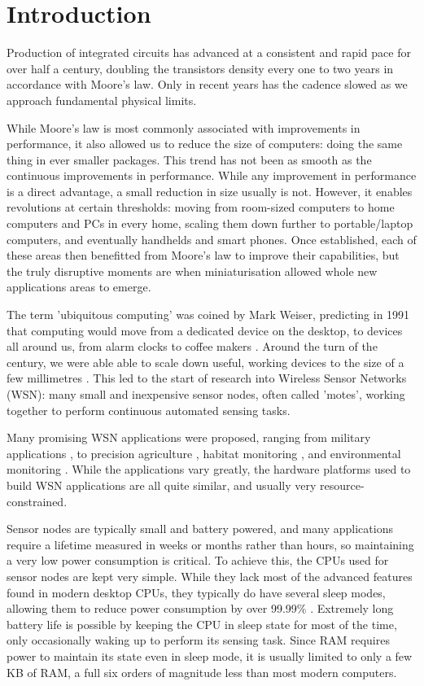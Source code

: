 \chapter{Introduction}
\label{sec-introduction}

Production of integrated circuits has advanced at a consistent and rapid pace for over half a century, doubling the transistors density every one to two years in accordance with Moore's law. Only in recent years has the cadence slowed as we approach fundamental physical limits.

While Moore's law is most commonly associated with improvements in performance, it also allowed us to reduce the size of computers: doing the same thing in ever smaller packages. This trend has not been as smooth as the continuous improvements in performance. While any improvement in performance is a direct advantage, a small reduction in size usually is not. However, it enables revolutions at certain thresholds: moving from room-sized computers to home computers and PCs in every home,  scaling them down further to portable/laptop computers, and eventually handhelds and smart phones. Once established, each of these areas then benefitted from Moore's law to improve their capabilities, but the truly disruptive moments are when miniaturisation allowed whole new applications areas to emerge.

The term 'ubiquitous computing' was coined by Mark Weiser, predicting in 1991 that computing would move from a dedicated device on the desktop, to devices all around us, from alarm clocks to coffee makers \cite{Weiser:1991wz}. Around the turn of the century, we were able able to scale down useful, working devices to the size of a few millimetres \cite{Warneke:2001ui}. This led to the start of research into Wireless Sensor Networks (WSN): many small and inexpensive sensor nodes, often called 'motes', working together to perform continuous automated sensing tasks.

Many promising WSN applications were proposed, ranging from military applications \cite{Arora:2004}, to precision agriculture \cite{Langendoen:2006un}, habitat monitoring \cite{Mainwaring:2002wb}, and environmental monitoring \cite{WernerAllen:2006ta, Chang:2010ek}. While the applications vary greatly, the hardware platforms used to build WSN applications are all quite similar, and usually very resource-constrained.

Sensor nodes are typically small and battery powered, and many applications require a lifetime measured in weeks or months rather than hours, so maintaining a very low power consumption is critical. To achieve this, the CPUs used for sensor nodes are kept very simple. While they lack most of the advanced features found in modern desktop CPUs, they typically do have several sleep modes, allowing them to reduce power consumption by over 99.99\% \cite{Atmel:ATmega128Datasheet}. Extremely long battery life is possible by keeping the CPU in sleep state for most of the time, only occasionally waking up to perform its sensing task. Since RAM requires power to maintain its state even in sleep mode, it is usually limited to only a few KB of RAM, a full six orders of magnitude less than most modern computers.

